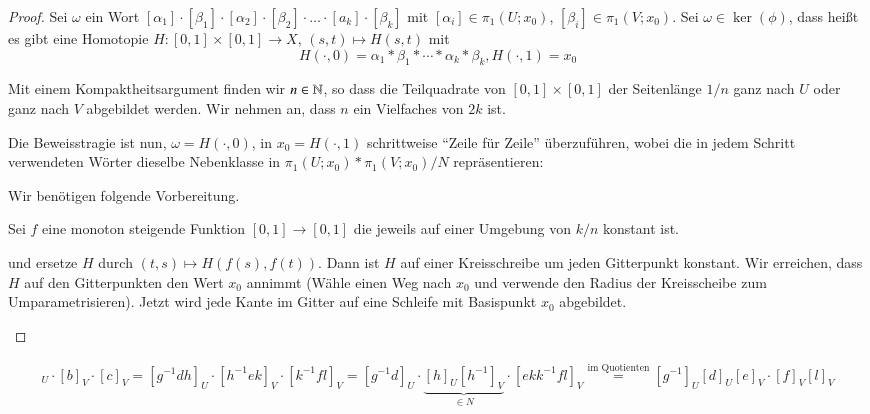 \documentclass[a4paper,10pt]{scrartcl}
\begin{document}
\begin{proof}
 Sei $\omega$ ein Wort $[\alpha_1]\cdot[\beta_1]\cdot[\alpha_2]\cdot[\beta_2]\cdot\dotsc\cdot[a_k]\cdot[\beta_k]$ mit $[\alpha_i]\in \pi_1(U;x_0)$, $[\beta_i]\in \pi_1(V;x_0)$. Sei $\omega\in \ker(\phi)$, dass heißt es gibt eine Homotopie 
$H:[0,1]\times[0,1]\to X$, $(s,t)\mapsto H(s,t)$ mit 
\[
 H(\cdot, 0)=\alpha_1*\beta_1*\dotsb *\alpha_k*\beta_k, H(\cdot, 1)=x_0
\]
\begin{figure}[H]
 \centering

\caption{}
\end{figure}
Mit einem Kompaktheitsargument finden wir $n\in \mathbb{N}$, so dass die Teilquadrate von $[0,1]\times[0,1]$ der Seitenlänge $1/n$ ganz nach $U$ oder ganz nach $V$ abgebildet werden. Wir nehmen an, dass $n$ ein Vielfaches von $2k$ ist.

Die Beweisstragie ist nun, $\omega=H(\cdot, 0)$, in $x_0=H(\cdot, 1)$ schrittweise "`Zeile für Zeile"' überzuführen, wobei die in jedem Schritt verwendeten Wörter dieselbe Nebenklasse in $\pi_1(U;x_0)*\pi_1(V;x_0)/N$ repräsentieren:
\begin{figure}[H]
 \centering

\caption{}
\end{figure} 
Wir benötigen folgende Vorbereitung.

Sei $f$ eine monoton steigende Funktion $[0,1]\to[0,1]$ die jeweils auf einer Umgebung von $k/n$ konstant ist.
\begin{figure}[H]
 \centering

\caption{}
\end{figure}
und ersetze $H$ durch $(t,s)\mapsto H(f(s), f(t))$. Dann ist $H$ auf einer Kreisschreibe um jeden Gitterpunkt konstant.  Wir erreichen, dass $H$ auf den Gitterpunkten den Wert $x_0$ annimmt (Wähle einen Weg nach $x_0$ und verwende den Radius der Kreisscheibe zum Umparametrisieren). Jetzt wird jede Kante im Gitter auf eine Schleife mit Basispunkt $x_0$ abgebildet.
\begin{figure}[H]
 \centering

\caption{}
\end{figure} 
\end{proof}
\begin{ex*}
 \begin{figure}[H]
 \centering

\caption{}
\end{figure}
\begin{align*}
 [a]_U\cdot [b]_V\cdot [c]_V=[g^{-1}dh]_U\cdot [h^{-1} ek]_V\cdot [k^{-1}f l]_V=[g^{-1}d]_U\cdot \underbrace{[h]_U[h^{-1}]_V}_{\in N}\cdot [ekk^{-1}fl]_V\stackrel{\text{im Quotienten}}=[g^{-1}]_U[d]_U[e]_V\cdot [f]_V[l]_V 
\end{align*}
\end{ex*}
\end{document}

